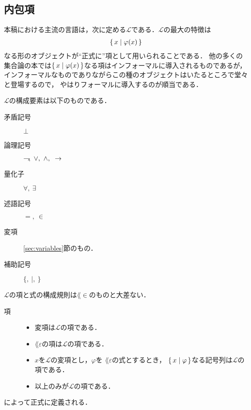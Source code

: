 \subsection{内包項}
	本稿における主流の言語は，次に定める$\mathcal{L}$である．$\mathcal{L}$の最大の特徴は
	\begin{align}
		\{\, x \mid \varphi(x)\, \}
	\end{align}
	なる形のオブジェクトが``正式に''項として用いられることである．
	他の多くの集合論の本では$\{\, x \mid \varphi(x)\, \}$なる項はインフォーマルに導入されるものであるが，
	インフォーマルなものでありながらこの種のオブジェクトはいたるところで堂々と登場するので，
	やはりフォーマルに導入するのが順当である．
	
	$\mathcal{L}$の構成要素は以下のものである．
	
	\begin{description}
		\item[矛盾記号] $\bot$
		\item[論理記号] $\negation,\ \vee,\ \wedge,\ \rarrow$
		\item[量化子] $\forall,\ \exists$
		\item[述語記号] $=,\ \in$
		\item[変項] \ref{sec:variables}節のもの．
		\item[補助記号] $\{,\ |,\ \}$
	\end{description}
	
	$\mathcal{L}$の項と式の構成規則は$\lang{\in}$のものと大差ない．
	
	\begin{description}
		\item[項] 
			\begin{itemize}
				\item 変項は$\mathcal{L}$の項である．
				\item $\lang{\varepsilon}$の項は$\mathcal{L}$の項である．
				\item $x$を$\mathcal{L}$の変項とし，$\varphi$を
					$\lang{\varepsilon}$の式とするとき，
					$\{\, x \mid \varphi\, \}$なる記号列は$\mathcal{L}$の項である．
				\item 以上のみが$\mathcal{L}$の項である．
			\end{itemize}
	\end{description}
	
	によって正式に定義される．
	
